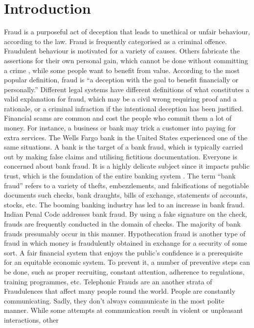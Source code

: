 \documentclass[sn-basic]{sn-jnl}%
\theoremstyle{thmstyleone}%
\theoremstyle{thmstyletwo}%
\theoremstyle{thmstylethree}%
\begin{document}



\maketitle          %
%
\section{Introduction}
Fraud is a purposeful act of deception that leads to unethical or unfair behaviour, according to the law. Fraud is frequently categorised as a criminal offence. Fraudulent behaviour \cite{kaltenbrunner2018sika} is motivated for a variety of causes. Others fabricate the assertions for their own personal gain, which cannot be done without committing a crime \cite{rotaru2022event}, while some people want to benefit from value.  According to the most popular definition, fraud is “a deception with the goal to benefit financially or personally.” Different legal systems have different definitions of what constitutes a valid explanation for fraud, which may be a civil wrong requiring proof and a rationale, or a criminal infraction if the intentional deception has been justified. Financial scams are common and cost the people who commit them a lot of money. For instance, a business or bank may trick a customer into paying for extra services. The Wells Fargo bank in the United States experienced one of the same situations. A bank is the target of a bank fraud, which is typically carried out by making false claims and utilising fictitious documentation. Everyone is concerned about bank fraud. It is a highly delicate subject since it impacts public trust, which is the foundation of the entire banking system \cite{zhu2022drives}. The term “bank fraud” refers to a variety of thefts, embezzlements, and falsifications of negotiable documents such checks, bank draughts, bills of exchange, statements of accounts, stocks, etc. The booming banking industry has led to an increase in bank fraud. Indian Penal Code \cite{paramasivan2022empirical} addresses bank fraud. By using a fake signature on the check, frauds are frequently conducted in the domain of checks. The majority of bank frauds presumably occur in this manner. Hypothecation fraud is another type of fraud in which money is fraudulently obtained in exchange for a security of some sort. A fair financial system that enjoys the public's confidence is a prerequisite for an equitable economic system. To prevent it, a number of preventive steps can be done, such as proper recruiting, constant attention, adherence to regulations, training programmes, etc. Telephonic Frauds are an another strata of Fraudulences that affect many people round the world. People are constantly communicating. Sadly, they don't always communicate in the most polite manner. While some attempts at communication result in violent or unpleasant interactions, other 
\end{document}
